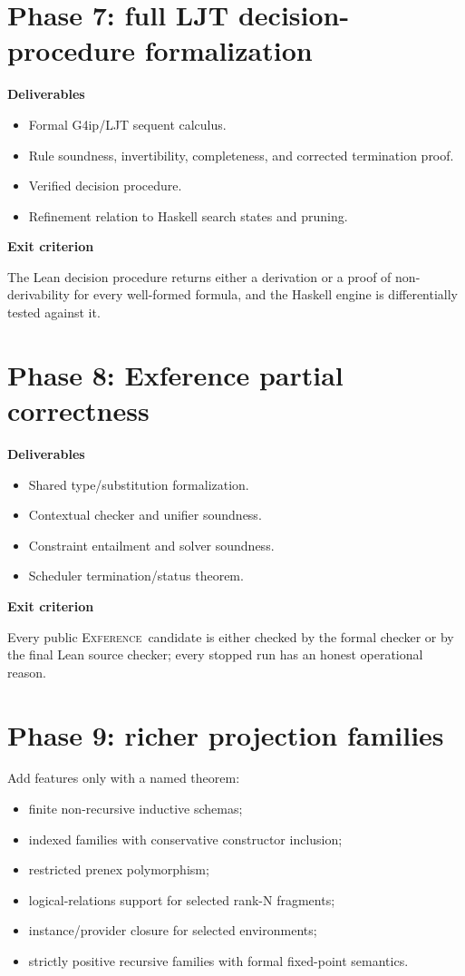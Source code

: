 \documentclass[11pt,letterpaper,openany]{report}
\theoremstyle{definition}
\theoremstyle{remark}
\newcommand{\Exference}{\textsc{Exference}}
\begin{document}
\section{Phase 7: full LJT decision-procedure formalization}

\textbf{Deliverables}
\begin{itemize}
\item Formal G4ip/LJT sequent calculus.
\item Rule soundness, invertibility, completeness, and corrected termination proof.
\item Verified decision procedure.
\item Refinement relation to Haskell search states and pruning.
\end{itemize}

\textbf{Exit criterion}

The Lean decision procedure returns either a derivation or a proof of non-derivability for every well-formed formula, and the Haskell engine is differentially tested against it.

\section{Phase 8: Exference partial correctness}

\textbf{Deliverables}
\begin{itemize}
\item Shared type/substitution formalization.
\item Contextual checker and unifier soundness.
\item Constraint entailment and solver soundness.
\item Scheduler termination/status theorem.
\end{itemize}

\textbf{Exit criterion}

Every public \Exference\ candidate is either checked by the formal checker or by the final Lean source checker; every stopped run has an honest operational reason.

\section{Phase 9: richer projection families}

Add features only with a named theorem:

\begin{itemize}
\item finite non-recursive inductive schemas;
\item indexed families with conservative constructor inclusion;
\item restricted prenex polymorphism;
\item logical-relations support for selected rank-N fragments;
\item instance/provider closure for selected environments;
\item strictly positive recursive families with formal fixed-point semantics.
\end{itemize}
\end{document}
